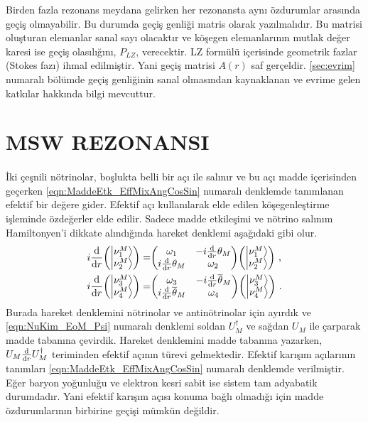 Birden fazla rezonans meydana gelirken her rezonansta aynı özdurumlar arasında geçiş olmayabilir. Bu durumda geçiş genliği matris olarak yazılmalıdır. Bu matrisi oluşturan elemanlar sanal sayı olacaktır ve köşegen elemanlarının mutlak değer karesi ise geçiş olasılığını, $ P_{LZ} $, verecektir.  LZ formülü içerisinde geometrik fazlar (Stokes fazı) ihmal edilmiştir. Yani geçiş matrisi $ A(r) $ saf gerçeldir. \ref{sec:evrim} numaralı bölümde geçiş genliğinin sanal olmasından kaynaklanan ve evrime gelen katkılar hakkında bilgi mevcuttur.

\section{MSW REZONANSI}\label{sec:mswRezonansi}
\paragraph{}
İki çeşnili nötrinolar, boşlukta belli bir açı ile salınır ve bu açı madde içerisinden geçerken \eqref{eqn:MaddeEtk_EffMixAngCosSin} numaralı denklemde tanımlanan efektif bir değere gider. Efektif açı kullanılarak elde edilen köşegenleştirme işleminde özdeğerler elde edilir. Sadece madde etkileşimi ve nötrino salınım Hamiltonyen'i dikkate alındığında hareket denklemi aşağıdaki gibi olur. 
\begin{align}
	i \dv{r} \mqty(\ket{\nu^{M}_{1}}\\ \ket{\nu^{M}_{2}}) =& \mqty(\omega_{1} & -i \dv{r}\theta_{M} \\ i \dv{r}\theta_{M} & \omega_{2}) \mqty(\ket{\nu^{M}_{1}}\\ \ket{\nu^{M}_{2}}) \text{ ,}\\
	i \dv{r} \mqty(\ket{\nu^{M}_{3}}\\ \ket{\nu^{M}_{4}}) =& \mqty(\omega_{3} & -i \dv{r}\overline{\theta}_{M} \\ i \dv{r}\overline{\theta}_{M} & \omega_{4}) \mqty(\ket{\nu^{M}_{3}}\\ \ket{\nu^{M}_{4}}) \text{ .}
\end{align}
Burada hareket denklemini nötrinolar ve antinötrinolar için ayırdık ve \eqref{eqn:NuKim_EoM_Psi} numaralı denklemi soldan $ U^{\dagger}_{M} $ ve sağdan $ U_{M} $ ile çarparak madde tabanına çevirdik. Hareket denklemini madde tabanına yazarken, $ U_{M}\dv{r}U^{\dagger}_{M} $ teriminden efektif açının türevi gelmektedir. Efektif karışım açılarının tanımları \eqref{eqn:MaddeEtk_EffMixAngCosSin} numaralı denklemde verilmiştir. Eğer baryon yoğunluğu ve elektron kesri sabit ise sistem tam adyabatik durumdadır. Yani efektif karışım açısı konuma bağlı olmadığı için madde özdurumlarının birbirine geçişi mümkün değildir. 

